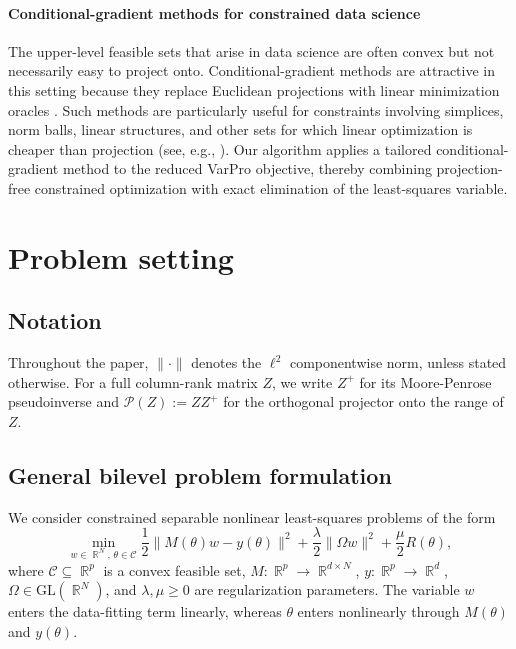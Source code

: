 \documentclass{article}
\DeclareMathOperator{\R}{\mathbb{R}}
\begin{document}
\paragraph{Conditional-gradient methods for constrained data science}
The upper-level feasible sets that arise in data science are often convex but not necessarily easy to project onto. Conditional-gradient methods are attractive in this setting because they replace Euclidean projections with linear minimization oracles \cite{bomze2021frank, braun2025conditional, Frank1956-fg}. Such methods are particularly useful for constraints involving simplices, norm balls, linear structures, and other sets for which linear optimization is cheaper than projection (see, e.g., \cite{combettes2021complexity,jaggi2013revisiting}). Our algorithm applies a tailored conditional-gradient method to the reduced VarPro objective, thereby combining projection-free constrained optimization with exact elimination of the least-squares variable.

\section{Problem setting}\label{sec:problem_formulation}

\subsection{Notation}

Throughout the paper, $\|\cdot\|$ denotes the $\ell^2$ componentwise norm, unless stated otherwise. For a full
column-rank matrix $Z$, we write $Z^+$ for its Moore-Penrose pseudoinverse and $\mathcal P(Z) := Z Z^+$ for the orthogonal projector onto the range of $Z$.

\subsection{General bilevel problem formulation}
We consider constrained separable nonlinear least-squares problems of the form
\begin{equation}\label{eq:varpro_general_formulation}
    \min_{w \in \R^{N},\,\theta \in \mathcal C}
    \frac12 \|M(\theta)w-y(\theta)\|^2
    + \frac{\lambda}{2}\|\Omega w\|^2
    + \frac{\mu}{2}R(\theta),
\end{equation}
where $\mathcal C \subseteq \R^p$ is a convex feasible set,
$M:\R^p \to \R^{d\times N}$, $y:\R^p \to \R^d$,
$\Omega\in \mathrm{GL}(\R^N)$, and $\lambda,\mu\geq 0$ are regularization
parameters. The variable $w$ enters the data-fitting term linearly, whereas
$\theta$ enters nonlinearly through $M(\theta)$ and $y(\theta)$.
\end{document}
